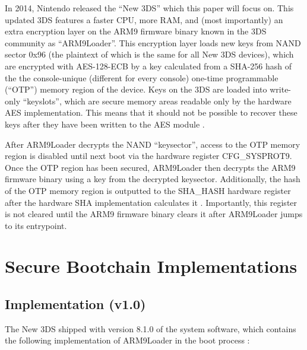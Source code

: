 \documentclass[journal]{IEEEtran}
\begin{document}
In 2014, Nintendo released the ``New 3DS'' which this paper will focus on. This
updated 3DS features a faster CPU, more RAM, and (most importantly) an extra
encryption layer on the ARM9 firmware binary known in the 3DS community as
``ARM9Loader''. This encryption layer loads new keys from NAND sector 0x96 (the
plaintext of which is the same for all New 3DS devices), which are encrypted
with AES-128-ECB by a key calculated from a SHA-256 hash of the the
console-unique (different for every console) one-time programmable (``OTP'')
memory region of the device. Keys on the 3DS are loaded into write-only
``keyslots'', which are secure memory areas readable only by the hardware AES
implementation. This means that it should not be possible to recover these keys
after they have been written to the AES module \cite{AES_Registers}.

After ARM9Loader decrypts the NAND ``keysector'', access to the OTP memory region
is disabled until next boot via the hardware register CFG\_SYSPROT9. Once the
OTP region has been secured, ARM9Loader then decrypts the ARM9 firmware binary
using a key from the decrypted keysector. Additionally, the hash of the OTP
memory region is outputted to the SHA\_HASH hardware register after the hardware
SHA implementation calculates it \cite{SHA_Registers}. Importantly, this
register is not cleared until the ARM9 firmware binary clears it after
ARM9Loader jumps to its entrypoint.

\section{Secure Bootchain Implementations}

\subsection{Implementation (v1.0)}

The New 3DS shipped with version 8.1.0 of the system software, which contains
the following implementation of ARM9Loader in the boot process \cite{FIRM}:
\end{document}
